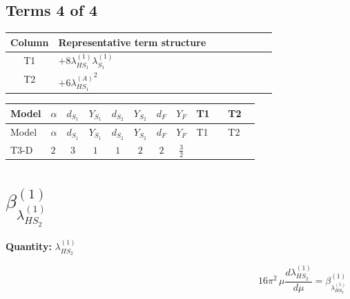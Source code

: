 \documentclass[8pt]{article}
\begin{document}
\begin{landscape}
\subsection*{Terms 4 of 4}
\begin{center}
\begin{tabular}{@{}c >{\raggedright\arraybackslash}p{0.82\linewidth}@{}}
\toprule
Column & Representative term structure \\
\midrule
T1 & \(\displaystyle +8 {\lambda_{HS_1}^{(1)}} {\lambda_{S_1}^{(1)}}\) \\
\midrule
T2 & \(\displaystyle +6 {\lambda_{HS_1}^{(A)}}^2\) \\
\midrule
\bottomrule
\end{tabular}
\end{center}
\smallskip
\tiny
\begin{longtable}{@{}llcccccc >{\raggedright\arraybackslash}p{0.21\linewidth} >{\raggedright\arraybackslash}p{0.21\linewidth}@{}}
\toprule
Model & $\alpha$ & $d_{S_1}$ & $Y_{S_1}$ & $d_{S_2}$ & $Y_{S_2}$ & $d_F$ & $Y_F$ & T1 & T2 \\
\midrule
\endfirsthead
\toprule
Model & $\alpha$ & $d_{S_1}$ & $Y_{S_1}$ & $d_{S_2}$ & $Y_{S_2}$ & $d_F$ & $Y_F$ & T1 & T2 \\
\midrule
\endhead
T3-D & $2$ & $3$ & $1$ & $1$ & $2$ & $2$ & $\frac{3}{2}$ & \scriptsize\adjustbox{max width=\linewidth}{$\begin{gathered} +8 {\lambda_{HS_1}^{(1)}} {\lambda_{S_1}^{(1)}}\end{gathered}$} & \scriptsize\adjustbox{max width=\linewidth}{$\begin{gathered} +6 {\lambda_{HS_1}^{(A)}}^2\end{gathered}$} \\
\midrule
\bottomrule
\end{longtable}
\clearpage
\section*{$\beta_{\lambda_{HS_2}^{(1)}}^{(1)}$}
\noindent\textbf{Quantity: }$\lambda_{HS_2}^{(1)}$\par\smallskip
\[16\pi^2\,\mu\frac{d \lambda_{HS_2}^{(1)}}{d\mu}=\beta_{\lambda_{HS_2}^{(1)}}^{(1)}\]

\end{landscape}
\end{document}
